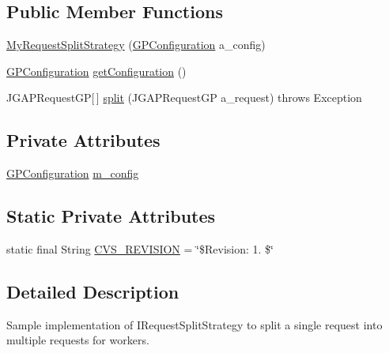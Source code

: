 \subsection*{Public Member Functions}
\begin{DoxyCompactItemize}
\item 
\hyperlink{classexamples_1_1grid_1_1math_problem_distributed_1_1_my_request_split_strategy_aedac73bb2a074b314900eb11b05d4ca4}{My\-Request\-Split\-Strategy} (\hyperlink{classorg_1_1jgap_1_1gp_1_1impl_1_1_g_p_configuration}{G\-P\-Configuration} a\-\_\-config)
\item 
\hyperlink{classorg_1_1jgap_1_1gp_1_1impl_1_1_g_p_configuration}{G\-P\-Configuration} \hyperlink{classexamples_1_1grid_1_1math_problem_distributed_1_1_my_request_split_strategy_a3f5cc092198a873ddddff035a74c9839}{get\-Configuration} ()
\item 
J\-G\-A\-P\-Request\-G\-P\mbox{[}$\,$\mbox{]} \hyperlink{classexamples_1_1grid_1_1math_problem_distributed_1_1_my_request_split_strategy_ab99515a0b31aab87cd16407f04e617e0}{split} (J\-G\-A\-P\-Request\-G\-P a\-\_\-request)  throws Exception 
\end{DoxyCompactItemize}
\subsection*{Private Attributes}
\begin{DoxyCompactItemize}
\item 
\hyperlink{classorg_1_1jgap_1_1gp_1_1impl_1_1_g_p_configuration}{G\-P\-Configuration} \hyperlink{classexamples_1_1grid_1_1math_problem_distributed_1_1_my_request_split_strategy_ade69c52c95d134fc7ca519cadd6c94f8}{m\-\_\-config}
\end{DoxyCompactItemize}
\subsection*{Static Private Attributes}
\begin{DoxyCompactItemize}
\item 
static final String \hyperlink{classexamples_1_1grid_1_1math_problem_distributed_1_1_my_request_split_strategy_a4a79429222cebf8eb018e714d8c36443}{C\-V\-S\-\_\-\-R\-E\-V\-I\-S\-I\-O\-N} = \char`\"{}\$Revision\-: 1. \$\char`\"{}
\end{DoxyCompactItemize}


\subsection{Detailed Description}
Sample implementation of I\-Request\-Split\-Strategy to split a single request into multiple requests for workers.

